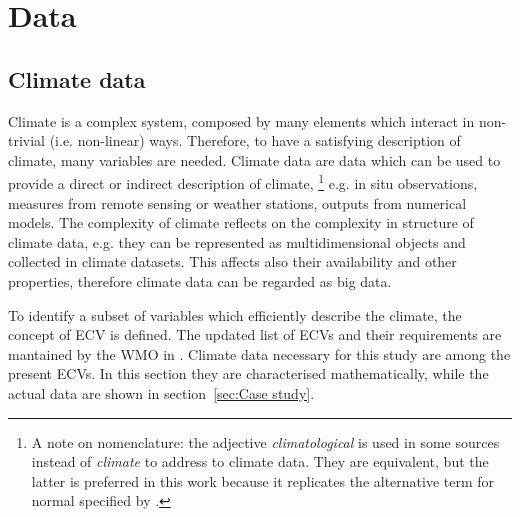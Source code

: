 \section{Data}
\label{sec:Data}



\subsection{Climate data}
Climate is a complex system, composed by many elements which interact in non-trivial (i.e. non-linear) ways. Therefore, to have a satisfying description of climate, many variables are needed. Climate data are data which can be used to provide a direct or indirect description of climate,%
\footnote{A note on nomenclature: the adjective \emph{climatological} is used in some sources instead of \emph{climate} to address to climate data. They are equivalent, but the latter is preferred in this work because it replicates the alternative term for \gls{normal} specified by \cite[1]{2017WorldMeteorologicalOrganizationWMOWMOGuidelines}.}
e.g. in situ observations, measures from remote sensing or weather stations, outputs from numerical models.\cite[1537]{2021SeneviratneWeatherAnd} The complexity of climate reflects on the complexity in structure of climate data, e.g. they can be represented as multidimensional objects and collected in climate datasets. This affects also their availability and other properties,\cite{2014FaghmousABig} therefore climate data can be regarded as big data.

To identify a subset of variables which efficiently describe the climate, the concept of \gls{ECV} is defined.\cite{2014BojinskiTheConcept} The updated list of \glspl{ECV} and their requirements are mantained by the \gls{WMO} in \cite[14-17]{2022WorldMeteorologicalOrganizationWMOThe2022}.
Climate data necessary for this study are among the present \glspl{ECV}. In this section they are characterised mathematically, while the actual data are shown in section~\ref{sec:Case study}.

